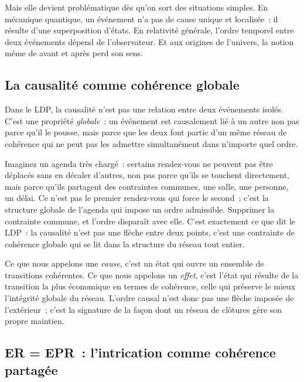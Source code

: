 \documentclass[12pt, a4paper, openright]{book}
\begin{document}
Mais elle devient problématique dès qu'on sort des situations simples. En mécanique quantique, un événement n'a pas de cause unique et localisée~: il résulte d'une superposition d'états. En relativité générale, l'ordre temporel entre deux événements dépend de l'observateur. Et aux origines de l'univers, la notion même de \og avant\fg{} et \og après\fg{} perd son sens.

\subsection*{La causalité comme cohérence globale}

Dans le LDP, la causalité n'est pas une relation entre deux événements isolés. C'est une propriété \emph{globale}~: un événement est causalement lié à un autre non pas parce qu'il le \og pousse\fg{}, mais parce que les deux font partie d'un même réseau de cohérence qui ne peut pas les admettre simultanément dans n'importe quel ordre.

\medskip

Imaginez un agenda très chargé~: certains rendez-vous ne peuvent pas être déplacés sans en décaler d'autres, non pas parce qu'ils se touchent directement, mais parce qu'ils partagent des contraintes communes, une salle, une personne, un délai. Ce n'est pas le premier rendez-vous qui \og force\fg{} le second~; c'est la structure globale de l'agenda qui impose un ordre admissible. Supprimer la contrainte commune, et l'ordre disparaît avec elle. C'est exactement ce que dit le LDP~: la causalité n'est pas une flèche entre deux points, c'est une contrainte de cohérence globale qui se lit dans la structure du réseau tout entier.

\medskip

Ce que nous appelons une \emph{cause}, c'est un état qui ouvre un ensemble de transitions cohérentes. Ce que nous appelons un \emph{effet}, c'est l'état qui résulte de la transition la plus économique en termes de cohérence, celle qui préserve le mieux l'intégrité globale du réseau. L'ordre causal n'est donc pas une flèche imposée de l'extérieur~; c'est la signature de la façon dont un réseau de clôtures gère son propre maintien.

\subsection*{ER = EPR~: l'intrication comme cohérence partagée}
\end{document}
